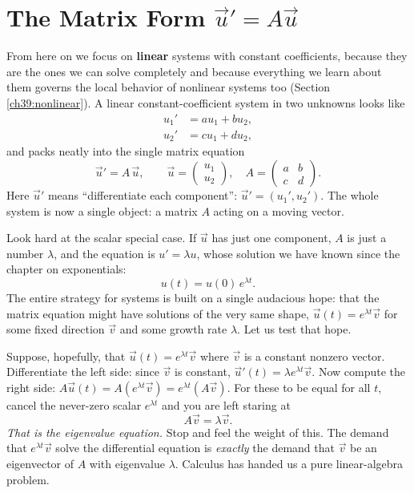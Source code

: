 \section{The Matrix Form $\vec{u}' = A\vec{u}$}
\label{ch39:matrixform}

From here on we focus on \textbf{linear} systems with constant coefficients,
because they are the ones we can solve completely and because everything we learn
about them governs the local behavior of nonlinear systems too (Section
\ref{ch39:nonlinear}). A linear constant-coefficient system in two unknowns
looks like
\[
  \begin{aligned}
    u_1' &= a u_1 + b u_2,\\
    u_2' &= c u_1 + d u_2,
  \end{aligned}
\]
and packs neatly into the single matrix equation
\[
  \boxed{\;\vec{u}' = A\,\vec{u}, \qquad
  \vec u = \begin{pmatrix} u_1 \\ u_2 \end{pmatrix}, \quad
  A = \begin{pmatrix} a & b \\ c & d \end{pmatrix}.\;}
\]
Here $\vec u'$ means ``differentiate each component'': $\vec u' = (u_1', u_2')$.
The whole system is now a single object: a matrix $A$ acting on a moving vector.

Look hard at the scalar special case. If $\vec u$ has just one component, $A$ is
just a number $\lambda$, and the equation is $u' = \lambda u$, whose solution we
have known since the chapter on exponentials:
\[
  u(t) = u(0)\,e^{\lambda t}.
\]
The entire strategy for systems is built on a single audacious hope: that the
matrix equation might have solutions of the very same shape, $\vec u(t) =
e^{\lambda t}\vec v$ for some fixed direction $\vec v$ and some growth rate
$\lambda$. Let us test that hope.

\begin{walkbox}
Suppose, hopefully, that $\vec u(t) = e^{\lambda t}\vec v$ where $\vec v$ is a
constant nonzero vector. Differentiate the left side: since $\vec v$ is constant,
$\vec u'(t) = \lambda e^{\lambda t}\vec v$. Now compute the right side:
$A\vec u(t) = A(e^{\lambda t}\vec v) = e^{\lambda t}(A\vec v)$. For these to be
equal for all $t$, cancel the never-zero scalar $e^{\lambda t}$ and you are left
staring at
\[
  A\vec v = \lambda\vec v.
\]
\emph{That is the eigenvalue equation.} Stop and feel the weight of this. The
demand that $e^{\lambda t}\vec v$ solve the differential equation is
\emph{exactly} the demand that $\vec v$ be an eigenvector of $A$ with eigenvalue
$\lambda$. Calculus has handed us a pure linear-algebra problem.
\end{walkbox}

